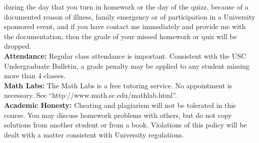 \documentclass[11pt]{amsart}
\begin{document}
during the day that you turn in homework or the day of the quizz, because of a documented
reason of illness, family emergency or of participation in a University
sponsored event, and if you have contact me immediately and provide me with the
documentation, then the grade of your missed homework or quiz will be dropped.\\[0.3cm]
{\bf Attendance:} Regular class attendance is important. Consistent
with the USC Undergraduate Bulletin, a grade penalty may be applied to
any student missing more than 4 classes.\\[0.3cm]
{\bf Math Labs:} The Math Labs is a free tutoring service. 
No appointment is necessary. See ``http://www.math.sc.edu/mathlab.html''.\\[0.3cm]
{\bf Academic Honesty:} Cheating and plagiarism will not be tolerated
in this course. You may discuss homework problems with others, but do
not copy solutions from another student or from a book. Violations of
this policy will be dealt with a matter consistent with University
regulations. 
\end{document}
